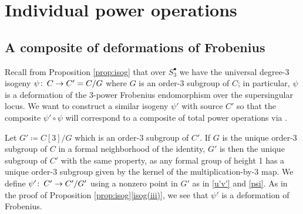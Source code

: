 \documentclass{gtpart}
\theoremstyle{definition}
\theoremstyle{remark}
\def\co{\colon\thinspace}
\newcommand{\s}{S^\bullet}
\newcommand{\isog}[1]{Proposition \ref{prop:isog}\thinspace \eqref{isog(#1)}}
\begin{document}
\section{Individual power operations}
\label{sec:individual}

\subsection{A composite of deformations of Frobenius}

Recall from Proposition \ref{prop:isog} that over $\s_3$ 
we have the universal degree-3 isogeny $\psi \co C \to C' = C/G$ 
where $G$ is an order-3 subgroup of $C$; 
in particular, $\psi$ is a deformation of the 3-power Frobenius endomorphism over the supersingular locus.  
We want to construct a similar isogeny $\psi'$ with source $C'$ 
so that the composite $\psi' \circ \psi$ will correspond to a composite of total power operations via \cite[Theorem B]{cong}.  

Let $G' \coloneqq C[3]/G$ which is an order-3 subgroup of $C'$.  
If $G$ is the unique order-3 subgroup of $C$ in a formal neighborhood of the identity, 
$G'$ is then the unique subgroup of $C'$ with the same property, 
as any formal group of height 1 has a unique order-3 subgroup given by the kernel of the multiplication-by-3 map.  
We define $\psi' \co C' \to C'/G'$ using a nonzero point in $G'$ as in \eqref{u'v'} and \eqref{psi}.  
As in the proof of \isog{iii}, we see that $\psi'$ is a deformation of Frobenius.  
\end{document}

